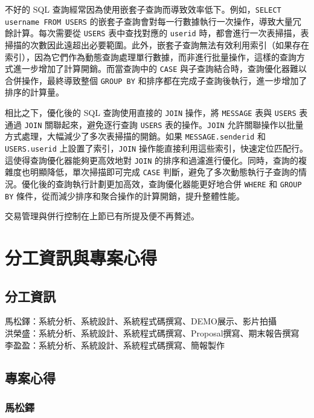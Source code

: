 \documentclass[12pt,a4paper]{article}
\begin{document}
不好的 SQL 查詢經常因為使用嵌套子查詢而導致效率低下。例如，\texttt{SELECT username FROM USERS} 的嵌套子查詢會對每一行數據執行一次操作，導致大量冗餘計算。每次需要從 \texttt{USERS} 表中查找對應的 \texttt{userid} 時，都會進行一次表掃描，表掃描的次數因此遠超出必要範圍。此外，嵌套子查詢無法有效利用索引（如果存在索引），因為它們作為動態查詢處理單行數據，而非進行批量操作，這樣的查詢方式進一步增加了計算開銷。而當查詢中的 \texttt{CASE} 與子查詢結合時，查詢優化器難以合併操作，最終導致整個 \texttt{GROUP BY} 和排序都在完成子查詢後執行，進一步增加了排序的計算量。

相比之下，優化後的 SQL 查詢使用直接的 \texttt{JOIN} 操作，將 \texttt{MESSAGE} 表與 \texttt{USERS} 表通過 \texttt{JOIN} 關聯起來，避免逐行查詢 \texttt{USERS} 表的操作。\texttt{JOIN} 允許關聯操作以批量方式處理，大幅減少了多次表掃描的開銷。如果 \texttt{MESSAGE.senderid} 和 \texttt{USERS.userid} 上設置了索引，\texttt{JOIN} 操作能直接利用這些索引，快速定位匹配行。這使得查詢優化器能夠更高效地對 \texttt{JOIN} 的排序和過濾進行優化。同時，查詢的複雜度也明顯降低，單次掃描即可完成 \texttt{CASE} 判斷，避免了多次動態執行子查詢的情況。優化後的查詢執行計劃更加高效，查詢優化器能更好地合併 \texttt{WHERE} 和 \texttt{GROUP BY} 條件，從而減少排序和聚合操作的計算開銷，提升整體性能。

交易管理與併行控制在上節已有所提及便不再贅述。

\section{分工資訊與專案心得}

\subsection{分工資訊}

馬松鐸：系統分析、系統設計、系統程式碼撰寫、DEMO展示、影片拍攝\\
洪榮盛：系統分析、系統設計、系統程式碼撰寫、Proposal撰寫、期末報告撰寫\\
李盈盈：系統分析、系統設計、系統程式碼撰寫、簡報製作

\subsection{專案心得}

\subsubsection*{馬松鐸}
\end{document}
